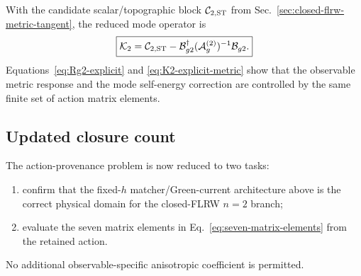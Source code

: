 With the candidate scalar/topographic block
$\mathcal C_{2,\rm ST}$ from
Sec.~\ref{sec:closed-flrw-metric-tangent}, the reduced mode operator is
\begin{equation}
\boxed{
\mathcal K_2
=
\mathcal C_{2,\rm ST}
-
\mathcal B_{g2}^{\dagger}
(\mathcal A_g^{(2)})^{-1}
\mathcal B_{g2}.
}
\label{eq:K2-explicit-metric}
\end{equation}
Equations~\eqref{eq:Rg2-explicit} and
\eqref{eq:K2-explicit-metric} show that the observable metric response and
the mode self-energy correction are controlled by the same finite set of
action matrix elements.

\subsection{Updated closure count}

The action-provenance problem is now reduced to two tasks:

\begin{enumerate}
\item confirm that the fixed-$h$ matcher/Green-current architecture above is
      the correct physical domain for the closed-FLRW $n=2$ branch;
\item evaluate the seven matrix elements in
      Eq.~\eqref{eq:seven-matrix-elements} from the retained action.
\end{enumerate}

No additional observable-specific anisotropic coefficient is permitted.
